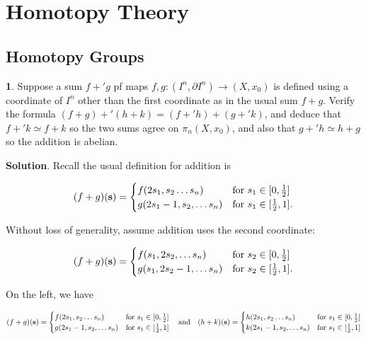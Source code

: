 \documentclass{article}
\begin{document}
\newpage

\section{Homotopy Theory}

\subsection{Homotopy Groups}

\tab \textbf{1}. Suppose a sum $f+'g$ pf maps $f, g:(I^{n}, \partial I^{n})\to (X, x_{0})$ is defined using a coordinate of $I^{n}$ other than the first coordinate as in the usual sum $f+g$. Verify the formula $(f+g) +' (h+k) = (f+'h) + (g+'k)$, and deduce that $f+'k\simeq f+k$ so the two sums agree on $\pi_{n}(X, x_{0})$, and also that $g+'h\simeq h + g$ so the addition is abelian.
\medskip

\textbf{Solution}. Recall the usual definition for addition is 

\[(f+g)(\mathbf{s}) = \begin{cases} f(2s_{1}, s_{2}\ldots s_{n}) & \textnormal{for } s_{1}\in [0, \frac{1}{2}]\\ g(2s_{1} - 1, s_{2},\ldots s_{n}) & \textnormal{for } s_{1}\in [\frac{1}{2}, 1]. \end{cases} \]

Without loss of generality, assume addition uses the second coordinate:

\[(f+g)(\mathbf{s}) = \begin{cases} f(s_{1}, 2s_{2},\ldots s_{n}) & \textnormal{for } s_{2}\in [0, \frac{1}{2}]\\ g(s_{1}, 2s_{2} - 1,\ldots s_{n}) & \textnormal{for } s_{2}\in [\frac{1}{2}, 1]. \end{cases}\]

On the left, we have

\[(f+g)(\mathbf{s}) = \begin{cases} f(2s_{1}, s_{2}\ldots s_{n}) & \textnormal{for } s_{1}\in [0, \frac{1}{2}]\\ g(2s_{1} - 1, s_{2},\ldots s_{n}) & \textnormal{for } s_{1}\in [\frac{1}{2}, 1] \end{cases}\quad \textnormal{and}\quad  (h+k)(\mathbf{s}) = \begin{cases} h(2s_{1}, s_{2}\ldots s_{n}) & \textnormal{for } s_{1}\in [0, \frac{1}{2}]\\ k(2s_{1} - 1, s_{2},\ldots s_{n}) & \textnormal{for } s_{1}\in [\frac{1}{2}, 1] \end{cases}
\]
\end{document}

